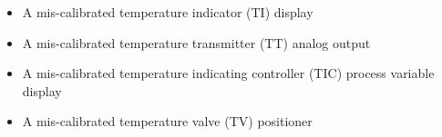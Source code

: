 \begin{itemize}
\item{} A mis-calibrated temperature indicator (TI) display
\vskip 5pt 
\item{} A mis-calibrated temperature transmitter (TT) analog output
\vskip 5pt 
\item{} A mis-calibrated temperature indicating controller (TIC) process variable display
\vskip 5pt 
\item{} A mis-calibrated temperature valve (TV) positioner
\end{itemize}





